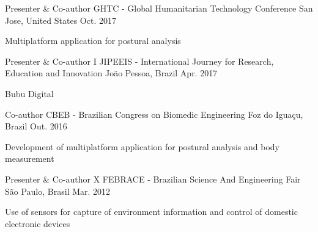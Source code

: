 \begin{cventries}

  \cventry
    {Presenter \& Co-author}
    {GHTC - Global Humanitarian Technology Conference}
    {San Jose, United States}
    {Oct. 2017}
    {
      \begin{cvitems}
        \item {Multiplatform application for postural analysis}
      \end{cvitems}
    }

  \cventry
    {Presenter \& Co-author}
    {I JIPEEIS - International Journey for Research, Education and Innovation }
    {João Pessoa, Brazil}
    {Apr. 2017}
    {
      \begin{cvitems}
        \item {Bubu Digital}
      \end{cvitems}
    }

  \cventry
    {Co-author}
    {CBEB - Brazilian Congress on Biomedic Engineering}
    {Foz do Iguaçu, Brazil}
    {Out. 2016}
    {
      \begin{cvitems}
        \item {Development of multiplatform application for postural analysis and body measurement}
      \end{cvitems}
    }
%
%

  \cventry
    {Presenter \& Co-author}
    {X FEBRACE - Brazilian Science And Engineering Fair}
    {São Paulo, Brasil}
    {Mar. 2012}
    {
      \begin{cvitems}
        \item {Use of sensors for capture of environment information and control of domestic electronic devices}
      \end{cvitems}
    }
\end{cventries}
